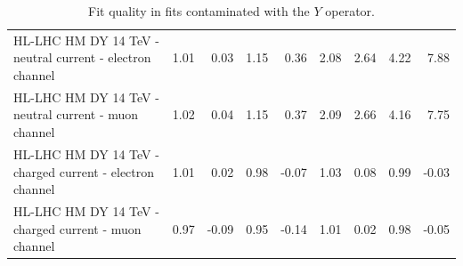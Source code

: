 \documentclass[withindex,glossary]{cam-thesis}
\begin{document}
\begin{table}[H]
\begin{tabular}{lrrrrrrrr}
HL-LHC HM DY 14 TeV - neutral current - electron channel & 1.01 & 0.03 & 1.15 & 0.36 & 2.08 & 2.64 & 4.22 & 7.88 \\
HL-LHC HM DY 14 TeV - neutral current - muon channel & 1.02 & 0.04 & 1.15 & 0.37 & 2.09 & 2.66 & 4.16 & 7.75 \\
HL-LHC HM DY 14 TeV - charged current - electron channel & 1.01 & 0.02 & 0.98 & -0.07 & 1.03 & 0.08 & 0.99 & -0.03 \\
HL-LHC HM DY 14 TeV - charged current - muon channel & 0.97 & -0.09 & 0.95 & -0.14 & 1.01 & 0.02 & 0.98 & -0.05 \\
\bottomrule
\end{tabular}
\caption{\label{tab:chi2_y} Fit quality in fits contaminated with the $Y$ operator.}
\end{table}
\end{document}
